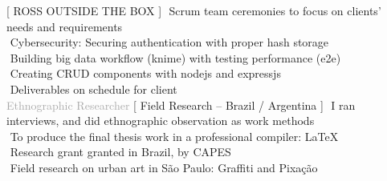 \begin{cvtable}
%
	{[ R{\scriptsize OSS} O{\scriptsize UTSIDE THE} B{\scriptsize OX} ]}{
        \textperiodcentered $ $ Scrum team ceremonies to focus on clients' needs and requirements \\        
        \textperiodcentered $ $ Cybersecurity: Securing authentication with proper hash storage \\
        \textperiodcentered $ $ Building big data workflow (knime) with testing performance (e2e) \\        
        \textperiodcentered $ $ Creating CRUD components with nodejs and expressjs \\
        \textperiodcentered $ $ Deliverables on schedule for client \\
        }  
% 
	{%
	\textcolor{darkgray}{%
    Ethnographic Researcher
	}}
	{
    [ Field Research -- Brazil / Argentina ]%
	}
	{
        \textperiodcentered $ $ I ran interviews, and did ethnographic observation as work methods \\
        \textperiodcentered $ $ To produce the final thesis work in a professional compiler: \LaTeX \\
        \textperiodcentered $ $ Research grant granted in Brazil, by CAPES \\ 
        \textperiodcentered $ $ Field research on urban art in São Paulo: Graffiti and Pixação %
	\wt{%
	}
	}
	

\end{cvtable}
